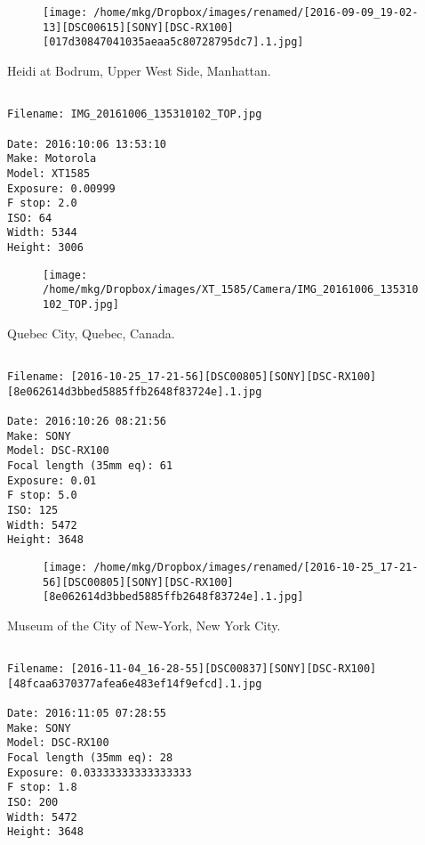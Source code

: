 \begin{figure}
\texttt{[image: /home/mkg/Dropbox/images/renamed/[2016-09-09\_19-02-13][DSC00615][SONY][DSC-RX100][017d30847041035aeaa5c80728795dc7].1.jpg]}
\end{figure}
    
\clearpage
\onecolumn
\noindent Heidi at Bodrum, Upper West Side, Manhattan.
\noindent
\begin{lstlisting}

Filename: IMG_20161006_135310102_TOP.jpg

Date: 2016:10:06 13:53:10
Make: Motorola
Model: XT1585
Exposure: 0.00999
F stop: 2.0
ISO: 64
Width: 5344
Height: 3006
\end{lstlisting}
\clearpage

\begin{figure}
\texttt{[image: /home/mkg/Dropbox/images/XT\_1585/Camera/IMG\_20161006\_135310102\_TOP.jpg]}
\end{figure}
    
\clearpage
\onecolumn
\noindent Quebec City, Quebec, Canada.
\noindent
\begin{lstlisting}

Filename: [2016-10-25_17-21-56][DSC00805][SONY][DSC-RX100][8e062614d3bbed5885ffb2648f83724e].1.jpg

Date: 2016:10:26 08:21:56
Make: SONY
Model: DSC-RX100
Focal length (35mm eq): 61
Exposure: 0.01
F stop: 5.0
ISO: 125
Width: 5472
Height: 3648
\end{lstlisting}
\clearpage

\begin{figure}
\texttt{[image: /home/mkg/Dropbox/images/renamed/[2016-10-25\_17-21-56][DSC00805][SONY][DSC-RX100][8e062614d3bbed5885ffb2648f83724e].1.jpg]}
\end{figure}
    
\clearpage
\onecolumn
\noindent Museum of the City of New-York, New York City.
\noindent
\begin{lstlisting}

Filename: [2016-11-04_16-28-55][DSC00837][SONY][DSC-RX100][48fcaa6370377afea6e483ef14f9efcd].1.jpg

Date: 2016:11:05 07:28:55
Make: SONY
Model: DSC-RX100
Focal length (35mm eq): 28
Exposure: 0.03333333333333333
F stop: 1.8
ISO: 200
Width: 5472
Height: 3648
\end{lstlisting}
\clearpage

